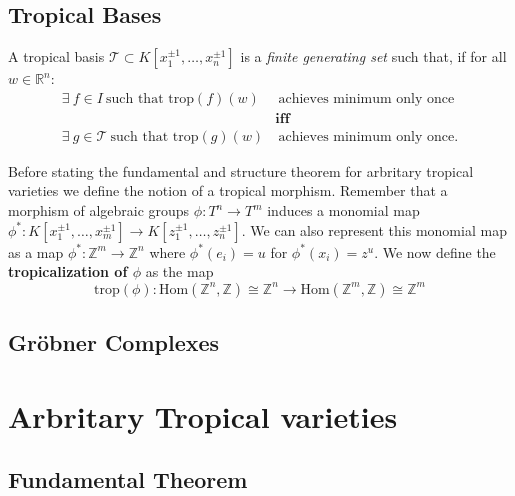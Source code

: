 \subsection{Tropical Bases}

A tropical basis $\mathcal{T}\subset K[x_1^{\pm 1}, \dots, x_n^{\pm 1}]$ is a \textit{finite generating set} such that, if for all $w \in \mathbb{R}^{n}$:
    \begin{align*}
        \exists ~f \in I~\text{such that }\text{trop}(f)(w)&~\text{achieves minimum only once}\\
                                                          & \textbf{iff}\\
        \exists ~g \in \mathcal{T}~\text{such that }\text{trop}(g)(w)&~\text{achieves minimum only once}.
    \end{align*}

    Before stating the fundamental and structure theorem for arbritary tropical varieties we define the notion of a tropical morphism.
    Remember that a morphism of algebraic groups $\phi : T^{n}\to T^{m}$ induces a monomial map $\phi^{*}:K[x_1^{\pm 1}, \dots, x_m^{\pm 1}]\to K[z_1^{\pm 1}, \dots, z_n^{\pm 1}]$. 
    We can also represent this monomial map as a map $\phi^{*}: \mathbb{Z}^{m}\to \mathbb{Z}^{n}$ where $\phi^{*}(e_i) = u$ for $\phi^{*}(x_i) = z^u$. We now define the \textbf{tropicalization of $\phi$} as the map
    \begin{equation*}
        \text{trop}(\phi): \text{Hom}(\mathbb{Z}^{n},\mathbb{Z})\cong \mathbb{Z}^{n} \to \text{Hom}(\mathbb{Z}^{m},\mathbb{Z})\cong \mathbb{Z}^{m}
    \end{equation*}

\subsection{Gr\"{o}bner Complexes}

\section{Arbritary Tropical varieties}
\subsection{Fundamental Theorem}

